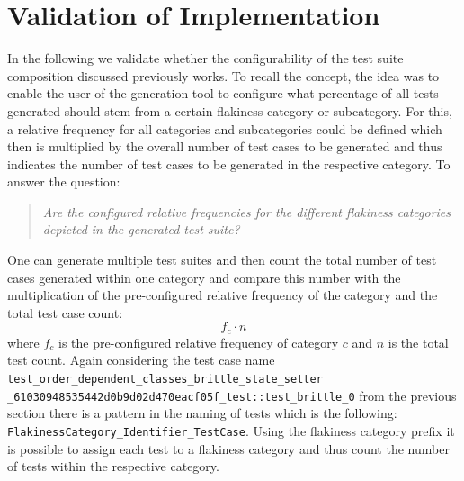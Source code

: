 \documentclass[
fancyheadings, %
%
%
]{stsreprt}
\begin{document}
\section{Validation of Implementation}
In the following we validate whether the configurability of the test suite composition discussed previously works. To recall the concept, the idea was to enable the user of the generation tool to configure what percentage of all tests generated should stem from a certain flakiness category or subcategory. For this, a relative frequency for all categories and subcategories could be defined which then is multiplied by the overall number of test cases to be generated and thus indicates the number of test cases to be generated in the respective category. To answer the question: 
\begin{quote}\emph{Are the configured relative frequencies for the different flakiness categories depicted in the generated test suite?}\end{quote}
One can generate multiple test suites and then count the total number of test cases generated within one category and compare this number with the multiplication of the pre-configured relative frequency of the category and the total test case count:
\[
    f_c \cdot n
\]
where $f_c$ is the pre-configured relative frequency of category $c$ and $n$ is the total test count. Again considering the test case name \lstinline{test_order_dependent_classes_brittle_state_setter _61030948535442d0b9d02d470eacf05f_test::test_brittle_0} from the previous section there is a pattern in the naming of tests which is the following: \lstinline{FlakinessCategory_Identifier_TestCase}.
Using the flakiness category prefix it is possible to assign each test to a flakiness category and thus count the number of tests within the respective category. 
\end{document}
